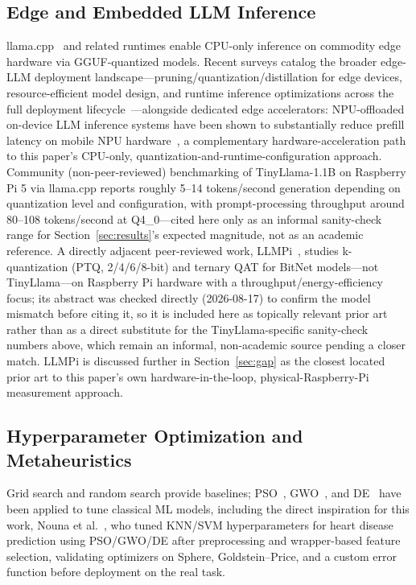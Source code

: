 \documentclass[journal]{IEEEtran}
\begin{document}
\subsection{Edge and Embedded LLM Inference}
llama.cpp~\cite{ref3} and related runtimes enable CPU-only inference on commodity edge hardware via GGUF-quantized models. Recent surveys catalog the broader edge-LLM deployment landscape---pruning/quantization/distillation for edge devices, resource-efficient model design, and runtime inference optimizations across the full deployment lifecycle~\cite{ref17}---alongside dedicated edge accelerators: NPU-offloaded on-device LLM inference systems have been shown to substantially reduce prefill latency on mobile NPU hardware~\cite{ref18}, a complementary hardware-acceleration path to this paper's CPU-only, quantization-and-runtime-configuration approach. Community (non-peer-reviewed) benchmarking of TinyLlama-1.1B on Raspberry Pi 5 via llama.cpp reports roughly 5--14 tokens/second generation depending on quantization level and configuration, with prompt-processing throughput around 80--108 tokens/second at Q4\_0---cited here only as an informal sanity-check range for Section~\ref{sec:results}'s expected magnitude, not as an academic reference. A directly adjacent peer-reviewed work, LLMPi~\cite{ref19}, studies k-quantization (PTQ, 2/4/6/8-bit) and ternary QAT for BitNet models---not TinyLlama---on Raspberry Pi hardware with a throughput/energy-efficiency focus; its abstract was checked directly (2026-08-17) to confirm the model mismatch before citing it, so it is included here as topically relevant prior art rather than as a direct substitute for the TinyLlama-specific sanity-check numbers above, which remain an informal, non-academic source pending a closer match. LLMPi is discussed further in Section~\ref{sec:gap} as the closest located prior art to this paper's own hardware-in-the-loop, physical-Raspberry-Pi measurement approach.

\subsection{Hyperparameter Optimization and Metaheuristics}
Grid search and random search provide baselines; PSO~\cite{ref8}, GWO~\cite{ref9}, and DE~\cite{ref10} have been applied to tune classical ML models, including the direct inspiration for this work, Nouna et al.~\cite{ref11}, who tuned KNN/SVM hyperparameters for heart disease prediction using PSO/GWO/DE after preprocessing and wrapper-based feature selection, validating optimizers on Sphere, Goldstein--Price, and a custom error function before deployment on the real task.
\end{document}
